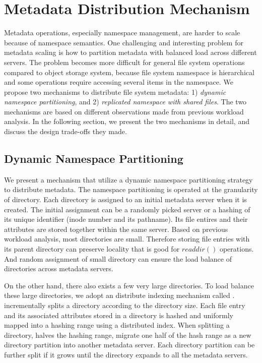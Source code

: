 \section{Metadata Distribution Mechanism}
Metadata operations, especially namespace management, are harder to scale
because of namespace semantics.
One challenging and interesting problem for metadata scaling is
how to partition metadata with balanced load across different servers.
The problem becomes more difficult for general file system operations
compared to object storage system,
because file system namespace is hierarchical and
some operations require accessing several items in the namespace.
We propose two mechanisms to distribute file system metadata:
1) \textit{dynamic namespace partitioning},
and 2) \textit{replicated namespace with shared files}.
The two mechanisms are based on different observations
made from previous workload analysis. In the following section,
we present the two mechanisms in detail, and discuss the design
trade-offs they made.

\subsection{Dynamic Namespace Partitioning}
We present a mechanism that utilize a dynamic
namespace partitioning strategy to distribute metadata.
The namespace partitioning is operated at the granularity of directory.
Each directory is assigned to an initial metadata server when it is created.
The initial assignment can be a randomly picked server or
a hashing of its unique identifier (inode number and its pathname).
Its file entires and their attributes are stored together within the same server.
Based on previous workload analysis, most directories are small.
Therefore storing file entries with its parent directory can preserve
locality that is good for $readdir()$ operations.
And random assignment of small directory can ensure the load balance
of directories across metadata servers.


On the other hand, there also exists a few very large directories.
To load balance these large directories, we adopt an distribute indexing mechanism
called \giga \cite{GIGA11}.
\giga incrementally splits a directory according to the directory size.
Each file entry and its associated attributes stored in a directory is
hashed and uniformly mapped into a hashing range using a distributed index.
When splitting a directory, \giga halves the hashing range,
migrate one half of the hash range as a new directory partition
into another metadata server.
Each directory partition can be further split if it grows
until the directory expands to all the metadata servers.

